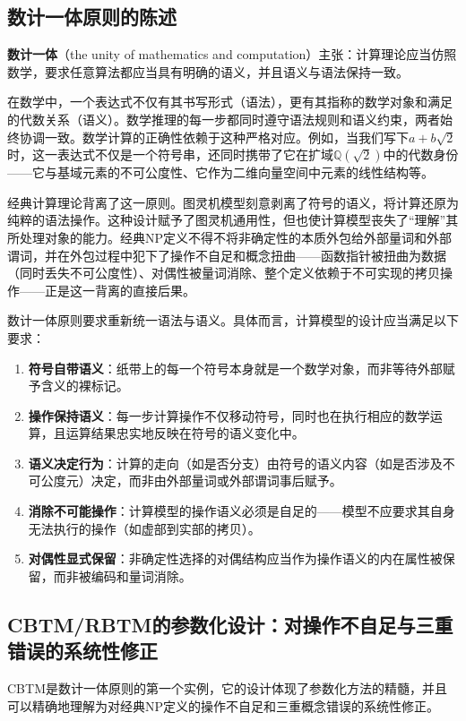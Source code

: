 \documentclass{ctexart}
\begin{document}
	\subsection{数计一体原则的陈述}
	
	\textbf{数计一体}（the unity of mathematics and computation）主张：计算理论应当仿照数学，要求任意算法都应当具有明确的语义，并且语义与语法保持一致。
	
	在数学中，一个表达式不仅有其书写形式（语法），更有其指称的数学对象和满足的代数关系（语义）。数学推理的每一步都同时遵守语法规则和语义约束，两者始终协调一致。数学计算的正确性依赖于这种严格对应。例如，当我们写下$a+b\sqrt{2}$时，这一表达式不仅是一个符号串，还同时携带了它在扩域$\mathbb{Q}(\sqrt{2})$中的代数身份——它与基域元素的不可公度性、它作为二维向量空间中元素的线性结构等。
	
	经典计算理论背离了这一原则。图灵机模型刻意剥离了符号的语义，将计算还原为纯粹的语法操作。这种设计赋予了图灵机通用性，但也使计算模型丧失了``理解''其所处理对象的能力。经典NP定义不得不将非确定性的本质外包给外部量词和外部谓词，并在外包过程中犯下了操作不自足和概念扭曲——函数指针被扭曲为数据（同时丢失不可公度性）、对偶性被量词消除、整个定义依赖于不可实现的拷贝操作——正是这一背离的直接后果。
	
	数计一体原则要求重新统一语法与语义。具体而言，计算模型的设计应当满足以下要求：
	\begin{enumerate}
		\item \textbf{符号自带语义}：纸带上的每一个符号本身就是一个数学对象，而非等待外部赋予含义的裸标记。
		\item \textbf{操作保持语义}：每一步计算操作不仅移动符号，同时也在执行相应的数学运算，且运算结果忠实地反映在符号的语义变化中。
		\item \textbf{语义决定行为}：计算的走向（如是否分支）由符号的语义内容（如是否涉及不可公度元）决定，而非由外部量词或外部谓词事后赋予。
		\item \textbf{消除不可能操作}：计算模型的操作语义必须是自足的——模型不应要求其自身无法执行的操作（如虚部到实部的拷贝）。
		\item \textbf{对偶性显式保留}：非确定性选择的对偶结构应当作为操作语义的内在属性被保留，而非被编码和量词消除。
	\end{enumerate}
	
	\subsection{CBTM/RBTM的参数化设计：对操作不自足与三重错误的系统性修正}
	
	CBTM是数计一体原则的第一个实例，它的设计体现了参数化方法的精髓，并且可以精确地理解为对经典NP定义的操作不自足和三重概念错误的系统性修正。
	
\end{document}
